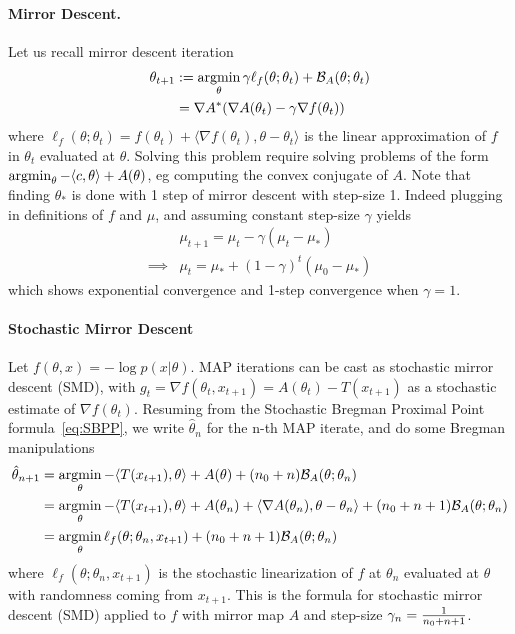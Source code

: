 \documentclass{article}
\newcommand{\logpart}{A}
\newcommand{\conj}{\logpart^*}
\newcommand{\bregman}{\cB_\logpart}
\newcommand{\nat}{\theta}
\newcommand{\linear}{\ell} %
\newcommand{\lr}{\gamma} %
\newcommand{\MAPt}{\hat \nat_n}
\begin{document}
\paragraph{Mirror Descent.}
Let us recall mirror descent iteration
\begin{align}
	\nat_{t+1} 
	&:= \argmin_\nat \lr \linear_f(\nat; \nat_t) + \bregman(\nat ; \nat_t)  \\
	& = \nabla \conj (\nabla \logpart(\nat_t) - \lr \nabla f(\nat_t))
\end{align}
where $\linear_f(\nat; \nat_t) = f(\nat_t) + \langle \nabla f(\nat_t), \nat - \nat_t \rangle$ is the linear approximation of $f$ in $\nat_t$ evaluated at $\nat$. Solving this problem require solving problems of the form $\argmin_\nat - \langle c, \nat \rangle + \logpart(\nat)$, eg computing the convex conjugate of $\logpart$. 
Note that finding $\nat_*$ is done with 1 step of mirror descent with step-size 1.
Indeed plugging in definitions of $f$ and $\mu$, and assuming constant step-size $\lr$ yields
\begin{align}
	&\mu_{t+1}  = \mu_t - \lr (\mu_t - \mu_*) \\
	\implies &\mu_t  = \mu_* + (1- \lr)^t (\mu_0 - \mu_*)
\end{align}
which shows exponential convergence and 1-step convergence when $\lr =1$. 

\paragraph{Stochastic Mirror Descent}
Let $f(\nat, x) = -\log p(x|\nat)$.
MAP iterations can be cast as stochastic mirror descent (SMD),  with $g_t = \nabla f(\nat_t, x_{t+1}) = \logpart(\nat_t) - T(x_{t+1})$ as a stochastic estimate  of $\nabla f(\nat_t)$.
Resuming from the Stochastic Bregman Proximal Point formula~\eqref{eq:SBPP}, we write $\MAPt$ for the n-th MAP iterate, and do some Bregman manipulations
\begin{align}
    \hat \nat_{n+1}
    &= \argmin_\nat 
    - \langle T(x_{t+1}), \nat \rangle  + \logpart(\nat) + (n_0 + n) \bregman(\nat ; \nat_n) \\
    &= \argmin_\nat - \langle T(x_{t+1}), \nat \rangle   + \logpart(\nat_n) + \langle \nabla \logpart(\nat_n)  , \nat - \nat_n \rangle + (n_0+n + 1) \bregman(\nat ; \nat_n) \\
    &= \argmin_\nat \linear_f(\nat;\nat_n, x_{t+1}) + (n_0 + n + 1) \bregman(\nat ; \nat_n)
\end{align}
where $\linear_f(\nat;\nat_n, x_{t+1})$ is the stochastic linearization of $f$ at $\nat_n$ evaluated at $\nat$ with randomness coming from $x_{t+1}$. This is the formula for stochastic mirror descent (SMD) applied to $f$ with mirror map $\logpart$ and step-size $\gamma_n = \frac{1}{n_0 + n + 1}$.
\end{document}
